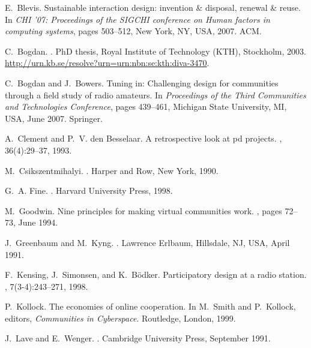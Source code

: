 \documentclass{sig-alt-release2}
\begin{document}


\begin{thebibliography}{10}

E.~Blevis.
\newblock Sustainable interaction design: invention \& disposal, renewal \&
  reuse.
\newblock In {\em CHI '07: Proceedings of the SIGCHI conference on Human
  factors in computing systems}, pages 503--512, New York, NY, USA, 2007. ACM.

C.~Bogdan.
.
\newblock PhD thesis, Royal Institute of Technology (KTH), Stockholm, 2003.
\newblock \url{http://urn.kb.se/resolve?urn=urn:nbn:se:kth:diva-3470}.

C.~Bogdan and J.~Bowers.
\newblock Tuning in: Challenging design for communities through a field study
  of radio amateurs.
\newblock In {\em Proceedings of the Third Communities and Technologies
  Conference}, pages 439--461, Michigan State University, MI, USA, June 2007.
  Springer.

A.~Clement and P.~V. den Besselaar.
\newblock A retrospective look at pd projects.
, 36(4):29--37, 1993.

M.~Csikszentmihalyi.
.
\newblock Harper and Row, New York, 1990.

G.~A. Fine.
.
\newblock Harvard University Press, 1998.

M.~Goodwin.
\newblock Nine principles for making virtual communities work.
, pages 72--73, June 1994.

J.~Greenbaum and M.~Kyng.
.
\newblock Lawrence Erlbaum, Hillsdale, NJ, USA, April 1991.

F.~Kensing, J.~Simonsen, and K.~B\"odker.
\newblock Participatory design at a radio station.
, 7(3-4):243--271, 1998.

P.~Kollock.
\newblock The economies of online cooperation.
\newblock In M.~Smith and P.~Kollock, editors, {\em Communities in Cyberspace}.
  Routledge, London, 1999.

J.~Lave and E.~Wenger.
.
\newblock Cambridge University Press, September 1991.


\end{thebibliography}
\end{document}
